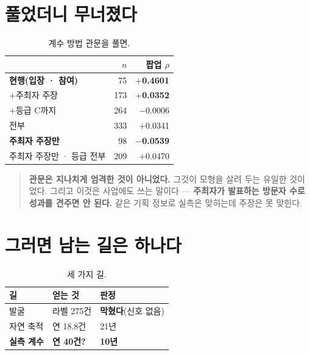 \documentclass[10pt]{article}
\begin{document}
\section{풀었더니 무너졌다}

\begin{table}[t]
\centering\tsize
\caption{계수 방법 관문을 풀면.}
\begin{tabular}{lrr}
\toprule
& $n$ & 팝업 $\rho$ \\
\midrule
\textbf{현행(입장 · 참여)} & 75 & \textbf{$+$0.4601} \\
$+$주최자 주장 & 173 & \textbf{$+$0.0352} \\
$+$등급 C까지 & 264 & $-$0.0006 \\
전부 & 333 & $+$0.0341 \\
\midrule
\textbf{주최자 주장만} & 98 & \textbf{$-$0.0539} \\
주최자 주장만 · 등급 전부 & 209 & $+$0.0470 \\
\bottomrule
\end{tabular}
\end{table}


\begin{quote}\fontsize{9.5}{11.5}\selectfont
\textbf{관문은 지나치게 엄격한 것이 아니었다.} 그것이 모형을 살려 두는
유일한 것이었다. 그리고 이것은 사업에도 쓰는 말이다 --- \textbf{주최자가
발표하는 방문자 수로 성과를 견주면 안 된다.} 같은 기획 정보로 실측은
맞히는데 주장은 못 맞힌다.
\end{quote}

\section{그러면 남는 길은 하나다}

\begin{table}[t]
\centering\tsize
\caption{세 가지 길.}
\begin{tabular}{lll}
\toprule
길 & 얻는 것 & 판정 \\
\midrule
발굴 & 라벨 275건 & \textbf{막혔다}(신호 없음) \\
자연 축적 & 연 18.8건 & 21년 \\
\textbf{실측 계수} & \textbf{연 40건?} & \textbf{10년} \\
\bottomrule
\end{tabular}
\end{table}
\end{document}
